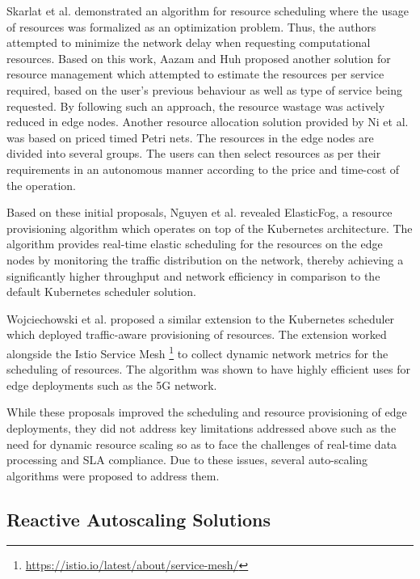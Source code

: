 Skarlat et al. \cite{skarlat2016resource} demonstrated an algorithm for resource scheduling where the usage of resources was formalized as an optimization problem. Thus, the authors attempted to minimize the network delay when requesting computational resources. Based on this work, Aazam and Huh \cite{aazam2015dynamic} proposed another solution for resource management which attempted to estimate the resources per service required, based on the user's previous behaviour as well as type of service being requested. By following such an approach, the resource wastage was actively reduced in edge nodes. Another resource allocation solution provided by Ni et al. \cite{ni2017resource} was based on priced timed Petri nets. The resources in the edge nodes are divided into several groups. The users can then select resources as per their requirements in an autonomous manner according to the price and time-cost of the operation.\par

Based on these initial proposals, Nguyen et al. \cite{nguyen2020elasticfog} revealed ElasticFog, a resource provisioning algorithm which operates on top of the Kubernetes architecture. The algorithm provides real-time elastic scheduling for the resources on the edge nodes by monitoring the traffic distribution on the network, thereby achieving a significantly higher throughput and network efficiency in comparison to the default Kubernetes scheduler solution.\par

Wojciechowski et al. \cite{wojciechowski2021netmarks} proposed a similar extension to the Kubernetes scheduler which deployed traffic-aware provisioning of resources. The extension worked alongside the Istio Service Mesh \footnote{\url{https://istio.io/latest/about/service-mesh/}} to collect dynamic network metrics for the scheduling of resources. The algorithm was shown to have highly efficient uses for edge deployments such as the 5G network.\par

While these proposals improved the scheduling and resource provisioning of edge deployments, they did not address key limitations addressed above such as the need for dynamic resource scaling so as to face the challenges of real-time data processing and SLA compliance. Due to these issues, several auto-scaling algorithms were proposed to address them.

\subsection{Reactive Autoscaling Solutions}
\label{subsec:reactive-solutions}

